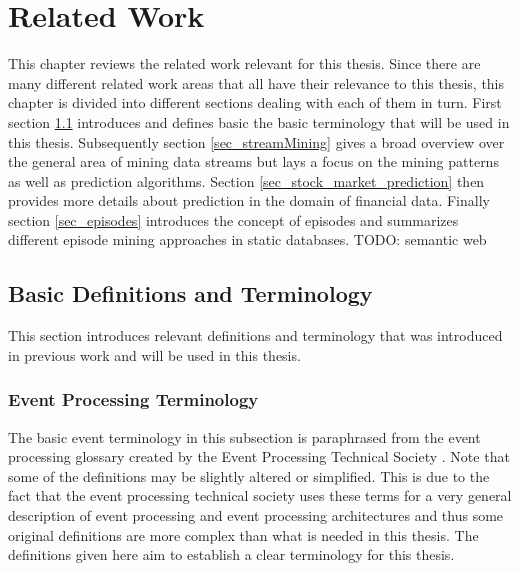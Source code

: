 
\chapter{Related Work}
\label{chapter_related}

\ifpdf
    \graphicspath{{Chapter2/Figs/Raster/}{Chapter2/Figs/PDF/}{Chapter2/Figs/}}
\else
    \graphicspath{{Chapter2/Figs/Vector/}{Chapter2/Figs/}}
\fi

This chapter reviews the related work relevant for this thesis. Since there are many different related work areas that all have their relevance to this thesis, this chapter is divided into different sections dealing with each of them in turn. First section \ref{sec_basicDefinitions} introduces and defines basic the basic terminology that will be used in this thesis. Subsequently section \ref{sec_streamMining} gives a broad overview over the general area of mining data streams but lays a focus on the mining patterns as well as prediction algorithms. Section \ref{sec_stock_market_prediction} then provides more details about prediction in the domain of financial data. Finally section \ref{sec_episodes} introduces the concept of episodes and summarizes different episode mining approaches in static databases. TODO: semantic web

\section{Basic Definitions and Terminology}
\label{sec_basicDefinitions}
This section introduces relevant definitions and terminology that was introduced in previous work and will be used in this thesis.

\subsection{Event Processing Terminology}
The basic event terminology in this subsection is paraphrased from the event processing glossary created by the Event Processing Technical Society \cite{luckham2011epts}. Note that some of the definitions may be slightly altered or simplified. This is due to the fact that the event processing technical society uses these terms for a very general description of event processing and event processing architectures and thus some original definitions are more complex than what is needed in this thesis. The definitions given here aim to establish a clear terminology for this thesis.

